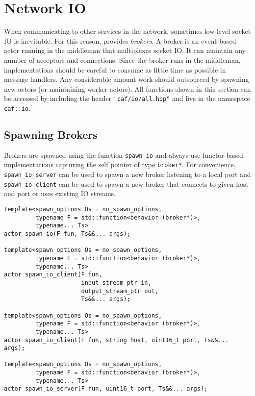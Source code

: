 \section{Network IO}
\label{Sec::NetworkIO}

When communicating to other services in the network, sometimes low-level socket IO is inevitable.
For this reason, \lib provides \emph{brokers}.
A broker is an event-based actor running in the middleman that multiplexes socket IO.
It can maintain any number of acceptors and connections.
Since the broker runs in the middleman, implementations should be careful to consume as little time as possible in message handlers.
Any considerable amount work should outsourced by spawning new actors (or maintaining worker actors).
All functions shown in this section can be accessed by including the header \lstinline^"caf/io/all.hpp"^ and live in the namespace \lstinline^caf::io^.


\subsection{Spawning Brokers}

Brokers are spawned using the function \lstinline^spawn_io^ and always use functor-based implementations capturing the self pointer of type \lstinline^broker*^.
For convenience, \lstinline^spawn_io_server^ can be used to spawn a new broker listening to a local port and \lstinline^spawn_io_client^ can be used to spawn a new broker that connects to given host and port or uses existing IO streams.

\begin{lstlisting}
template<spawn_options Os = no_spawn_options,
         typename F = std::function<behavior (broker*)>,
         typename... Ts>
actor spawn_io(F fun, Ts&&... args);

template<spawn_options Os = no_spawn_options,
         typename F = std::function<behavior (broker*)>,
         typename... Ts>
actor spawn_io_client(F fun,
                      input_stream_ptr in,
                      output_stream_ptr out,
                      Ts&&... args);

template<spawn_options Os = no_spawn_options,
         typename F = std::function<behavior (broker*)>,
         typename... Ts>
actor spawn_io_client(F fun, string host, uint16_t port, Ts&&... args);

template<spawn_options Os = no_spawn_options,
         typename F = std::function<behavior (broker*)>,
         typename... Ts>
actor spawn_io_server(F fun, uint16_t port, Ts&&... args);
\end{lstlisting}

